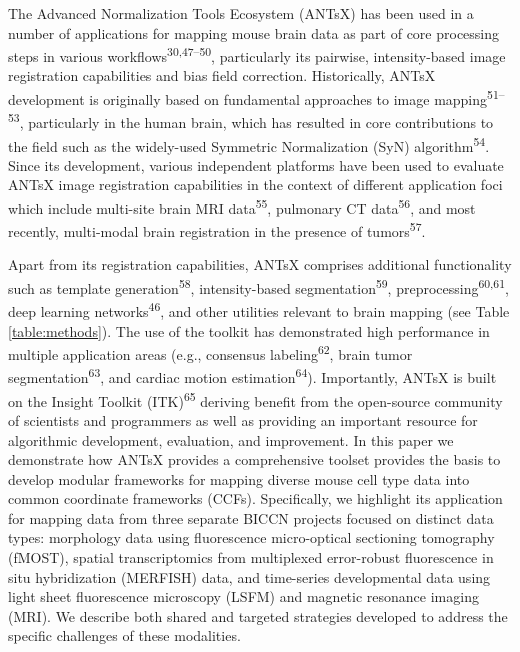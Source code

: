 \documentclass[
  12pt,
]{article}
\begin{document}
The Advanced Normalization Tools Ecosystem (ANTsX) has been used in a
number of applications for mapping mouse brain data as part of core
processing steps in various workflows\textsuperscript{30,47--50},
particularly its pairwise, intensity-based image registration
capabilities and bias field correction. Historically, ANTsX development
is originally based on fundamental approaches to image
mapping\textsuperscript{51--53}, particularly in the human brain, which
has resulted in core contributions to the field such as the widely-used
Symmetric Normalization (SyN) algorithm\textsuperscript{54}. Since its
development, various independent platforms have been used to evaluate
ANTsX image registration capabilities in the context of different
application foci which include multi-site brain MRI
data\textsuperscript{55}, pulmonary CT data\textsuperscript{56}, and
most recently, multi-modal brain registration in the presence of
tumors\textsuperscript{57}.

Apart from its registration capabilities, ANTsX comprises additional
functionality such as template generation\textsuperscript{58},
intensity-based segmentation\textsuperscript{59},
preprocessing\textsuperscript{60,61}, deep learning
networks\textsuperscript{46}, and other utilities relevant to brain
mapping (see Table \ref{table:methods}). The use of the toolkit has
demonstrated high performance in multiple application areas (e.g.,
consensus labeling\textsuperscript{62}, brain tumor
segmentation\textsuperscript{63}, and cardiac motion
estimation\textsuperscript{64}). Importantly, ANTsX is built on the
Insight Toolkit (ITK)\textsuperscript{65} deriving benefit from the
open-source community of scientists and programmers as well as providing
an important resource for algorithmic development, evaluation, and
improvement. In this paper we demonstrate how ANTsX provides a
comprehensive toolset provides the basis to develop modular frameworks
for mapping diverse mouse cell type data into common coordinate
frameworks (CCFs). Specifically, we highlight its application for
mapping data from three separate BICCN projects focused on distinct data
types: morphology data using fluorescence micro-optical sectioning
tomography (fMOST), spatial transcriptomics from multiplexed
error-robust fluorescence in situ hybridization (MERFISH) data, and
time-series developmental data using light sheet fluorescence microscopy
(LSFM) and magnetic resonance imaging (MRI). We describe both shared and
targeted strategies developed to address the specific challenges of
these modalities.
\end{document}
